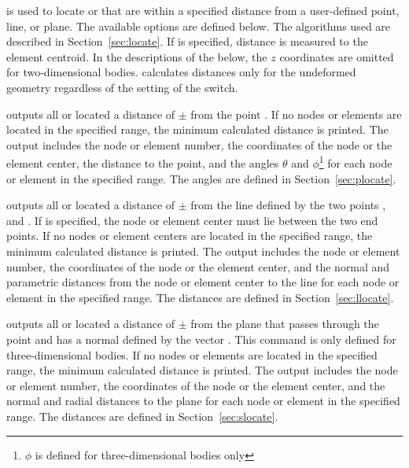  {
 is used to locate  or  that are
within a specified distance from a user-defined point, line, or plane.
The available options are defined below.  The algorithms used are
described in Section~\ref{sec:locate}.  If  is specified,
distance is measured to the element centroid.  In the descriptions of
the  below, the $z$ coordinates are omitted for
two-dimensional bodies.   calculates distances only for the
undeformed geometry regardless of the setting of the 
switch. 

 {
outputs all  or  located a
distance of $\pm$ from the
point .  If no nodes or elements are
located in the specified range, the minimum calculated distance
is printed.  The output includes the node or element number, the
coordinates of the node or the element center, the distance to the
point, and the angles $\theta$ and $\phi$\footnote{$\phi$ is defined for
three-dimensional bodies only} for each node or element in the specified
range.  The angles are defined in
Section~\ref{sec:plocate}. 
}

 {
outputs all  or  located a distance of
$\pm$ from the line defined by the two
points , and . If
 is specified, the node or element center must lie between
the two end points.  If no nodes or element centers are located in the
specified range, the minimum calculated distance is printed.  The output
includes the node or element number, the coordinates of the node or the
element center, and the normal and parametric distances from the node or
element center to the line for each node or element in the specified
range.  The distances are defined in Section~\ref{sec:llocate}. 
}

 {
outputs all  or  located a 
distance of $\pm$ from the plane that
passes through the point  and has a normal
defined by the vector . This command is only
defined for three-dimensional bodies.  If no nodes or elements are
located in the specified range, the minimum calculated distance is
printed.  The output includes the node or element number, the
coordinates of the node or the element center, and the normal and
radial distances to the plane for each node or element in the specified
range.  The distances are defined in
Section~\ref{sec:slocate}.
}
}

